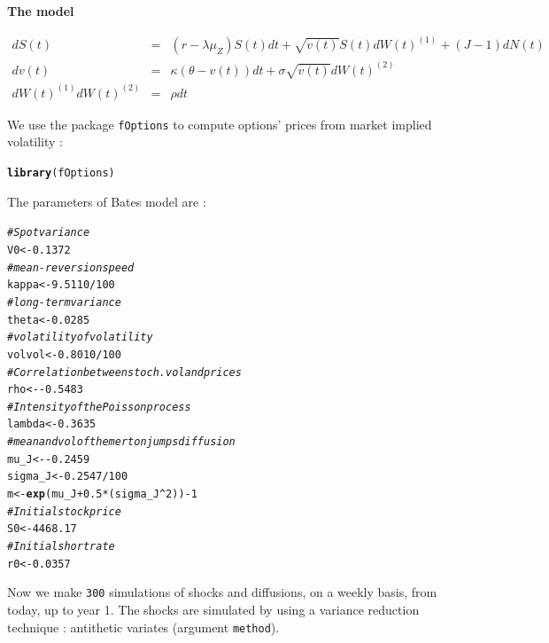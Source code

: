 \documentclass[a4paper]{article}\usepackage[]{graphicx}\usepackage[]{color}
\makeatletter
\newcommand{\hlnum}[1]{\textcolor[rgb]{0.686,0.059,0.569}{#1}}%
\newcommand{\hlcom}[1]{\textcolor[rgb]{0.678,0.584,0.686}{\textit{#1}}}%
\newcommand{\hlopt}[1]{\textcolor[rgb]{0,0,0}{#1}}%
\newcommand{\hlstd}[1]{\textcolor[rgb]{0.345,0.345,0.345}{#1}}%
\newcommand{\hlkwb}[1]{\textcolor[rgb]{0.69,0.353,0.396}{#1}}%
\newcommand{\hlkwd}[1]{\textcolor[rgb]{0.737,0.353,0.396}{\textbf{#1}}}%
\newenvironment{kframe}{%
 \def\at@end@of@kframe{}%
 \ifinner\ifhmode%
  \def\at@end@of@kframe{\end{minipage}}%
  \begin{minipage}{\columnwidth}%
 \fi\fi%
 \def\FrameCommand##1{\hskip\@totalleftmargin \hskip-\fboxsep
 \colorbox{shadecolor}{##1}\hskip-\fboxsep
     \hskip-\linewidth \hskip-\@totalleftmargin \hskip\columnwidth}%
 \MakeFramed {\advance\hsize-\width
   \@totalleftmargin\z@ \linewidth\hsize
   \@setminipage}}%
 {\par\unskip\endMakeFramed%
 \at@end@of@kframe}
\newenvironment{knitrout}{}{} %
\newcommand{\code}[1]{\mbox{\texttt{#1}}}
\makeatother
\begin{document}
\medskip

{\bf The model}

\begin{eqnarray*}
dS(t) &=& (r - \lambda \mu_Z) S(t) dt + \sqrt{v(t)} S(t) dW(t)^{(1)} + (J - 1) dN(t)\\
dv(t) &=& \kappa(\theta - v(t)) dt + \sigma \sqrt{v(t)} dW(t)^{(2)}\\
dW(t)^{(1)} dW(t)^{(2)} &=& \rho dt
\end{eqnarray*}

We use the package \code{fOptions} to compute options' prices from market implied volatility : 
\begin{knitrout}
\color{fgcolor}\begin{kframe}
\begin{alltt}
\hlkwd{library}\hlstd{(fOptions)}
\end{alltt}
\end{kframe}
\end{knitrout}

The parameters of Bates model are : 
\begin{knitrout}
\color{fgcolor}\begin{kframe}
\begin{alltt}
\hlcom{# Spot variance}
\hlstd{V0} \hlkwb{<-} \hlnum{0.1372}
\hlcom{# mean-reversion speed}
\hlstd{kappa} \hlkwb{<-} \hlnum{9.5110}\hlopt{/}\hlnum{100}
\hlcom{# long-term variance}
\hlstd{theta} \hlkwb{<-} \hlnum{0.0285}
\hlcom{# volatility of volatility}
\hlstd{volvol} \hlkwb{<-} \hlnum{0.8010}\hlopt{/}\hlnum{100}
\hlcom{# Correlation between stoch. vol and prices}
\hlstd{rho} \hlkwb{<-} \hlopt{-}\hlnum{0.5483}
\hlcom{# Intensity of the Poisson process}
\hlstd{lambda} \hlkwb{<-} \hlnum{0.3635}
\hlcom{# mean and vol of the merton jumps diffusion}
\hlstd{mu_J} \hlkwb{<-} \hlopt{-}\hlnum{0.2459}
\hlstd{sigma_J} \hlkwb{<-} \hlnum{0.2547}\hlopt{/}\hlnum{100}
\hlstd{m} \hlkwb{<-} \hlkwd{exp}\hlstd{(mu_J} \hlopt{+} \hlnum{0.5}\hlopt{*}\hlstd{(sigma_J}\hlopt{^}\hlnum{2}\hlstd{))} \hlopt{-} \hlnum{1}
\hlcom{# Initial stock price}
\hlstd{S0} \hlkwb{<-} \hlnum{4468.17}
\hlcom{# Initial short rate}
\hlstd{r0} \hlkwb{<-} \hlnum{0.0357}
\end{alltt}
\end{kframe}
\end{knitrout}

Now we make \code{300} simulations of shocks and diffusions, on a weekly basis, from today, up to year 1. The shocks are simulated by using a variance reduction technique : antithetic variates (argument \code{method}). 
\end{document}
